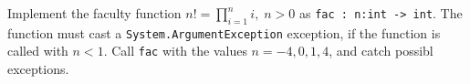 \label{fac1} Implement the faculty function $n! = \prod_{i=1}^ni,\; n >0$ as \lstinline{fac : n:int -> int}. The function must cast a \lstinline{System.ArgumentException} exception, if the function is called with $n < 1$. Call \lstinline{fac} with the values $n=-4,0,1,4$, and catch possibl exceptions.